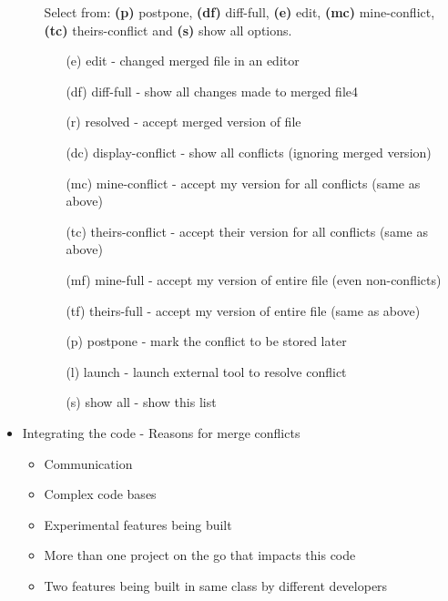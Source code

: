 \documentclass[11pt]{article}
\begin{document}
\begin{itemize}
\begin{itemize}
					Select from: \textbf{(p)} postpone, \textbf{(df)} diff-full, \textbf{(e)} edit, \textbf{(mc)} mine-conflict, \textbf{(tc)} theirs-conflict and \textbf{(s)} show all options.\\[-15pt]
					\begin{center}
						\begin{minipage}[c]{0.6\textwidth}
					\begin{itemize}
						\item[(e) edit] - changed merged file in an editor
						\item[(df) diff-full] - show all changes made to merged file4
						\item[(r) resolved]  - accept merged version of file\\
						\item[(dc) display-conflict] - show all conflicts (ignoring merged version)
						\item[(mc) mine-conflict] -  accept my version for all conflicts (same as above)
						\item[(tc) theirs-conflict] -  accept their version for all conflicts (same as above) \\
						\item[(mf) mine-full] - accept my version of entire file (even non-conflicts)
						\item[(tf) theirs-full]  - accept my version of entire file (same as above)\\
						\item[(p) postpone] - mark the conflict to be stored later
						\item[(l) launch] - launch external tool to resolve conflict
						\item[(s) show all] - show this list
					\end{itemize}
					\end{minipage}
					\end{center}
			\end{itemize}

	\item Integrating the code - Reasons for merge conflicts\\[-15pt]

		\begin{minipage}[t]{0.3\textwidth}
			\begin{itemize}
			\item Communication
			\item Complex code bases
			\item Experimental features being built
			\end{itemize}
		\end{minipage}
		\begin{minipage}[t]{0.5\textwidth}
			\begin{itemize}
				\item More than one project on the go that impacts this code
				\item Two features being built in same class by different developers
			\end{itemize}
		\end{minipage}


\end{itemize}
\end{document}

